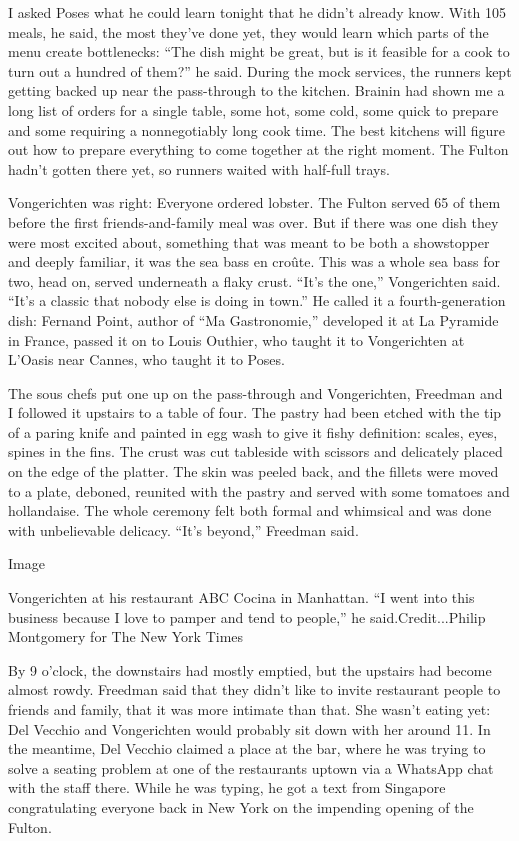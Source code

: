 I asked Poses what he could learn tonight that he didn't already know.
With 105 meals, he said, the most they've done yet, they would learn
which parts of the menu create bottlenecks: ``The dish might be great,
but is it feasible for a cook to turn out a hundred of them?'' he said.
During the mock services, the runners kept getting backed up near the
pass-through to the kitchen. Brainin had shown me a long list of orders
for a single table, some hot, some cold, some quick to prepare and some
requiring a nonnegotiably long cook time. The best kitchens will figure
out how to prepare everything to come together at the right moment. The
Fulton hadn't gotten there yet, so runners waited with half-full trays.

Vongerichten was right: Everyone ordered lobster. The Fulton served 65
of them before the first friends-and-family meal was over. But if there
was one dish they were most excited about, something that was meant to
be both a showstopper and deeply familiar, it was the sea bass en
croûte. This was a whole sea bass for two, head on, served underneath a
flaky crust. ``It's the one,'' Vongerichten said. ``It's a classic that
nobody else is doing in town.'' He called it a fourth-generation dish:
Fernand Point, author of ``Ma Gastronomie,'' developed it at La Pyramide
in France, passed it on to Louis Outhier, who taught it to Vongerichten
at L'Oasis near Cannes, who taught it to Poses.

The sous chefs put one up on the pass-through and Vongerichten, Freedman
and I followed it upstairs to a table of four. The pastry had been
etched with the tip of a paring knife and painted in egg wash to give it
fishy definition: scales, eyes, spines in the fins. The crust was cut
tableside with scissors and delicately placed on the edge of the
platter. The skin was peeled back, and the fillets were moved to a
plate, deboned, reunited with the pastry and served with some tomatoes
and hollandaise. The whole ceremony felt both formal and whimsical and
was done with unbelievable delicacy. ``It's beyond,'' Freedman said.

Image

Vongerichten at his restaurant ABC Cocina in Manhattan. ``I went into
this business because I love to pamper and tend to people,'' he
said.Credit...Philip Montgomery for The New York Times

By 9 o'clock, the downstairs had mostly emptied, but the upstairs had
become almost rowdy. Freedman said that they didn't like to invite
restaurant people to friends and family, that it was more intimate than
that. She wasn't eating yet: Del Vecchio and Vongerichten would probably
sit down with her around 11. In the meantime, Del Vecchio claimed a
place at the bar, where he was trying to solve a seating problem at one
of the restaurants uptown via a WhatsApp chat with the staff there.
While he was typing, he got a text from Singapore congratulating
everyone back in New York on the impending opening of the Fulton.


